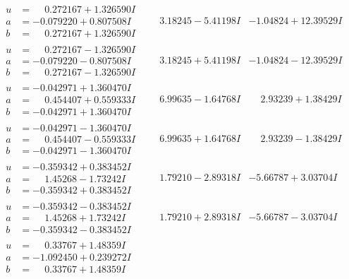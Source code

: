 \documentclass[1p]{elsarticle_modified}
\theoremstyle{definition}
\begin{document}
$$\begin{array}{c|c|c}
\begin{aligned}
u &= \phantom{-}0.272167 + 1.326590 I \\
a &= -0.079220 + 0.807508 I \\
b &= \phantom{-}0.272167 + 1.326590 I\end{aligned}
 & \phantom{-}3.18245 - 5.41198 I & -1.04824 + 12.39529 I \\ \hline\begin{aligned}
u &= \phantom{-}0.272167 - 1.326590 I \\
a &= -0.079220 - 0.807508 I \\
b &= \phantom{-}0.272167 - 1.326590 I\end{aligned}
 & \phantom{-}3.18245 + 5.41198 I & -1.04824 - 12.39529 I \\ \hline\begin{aligned}
u &= -0.042971 + 1.360470 I \\
a &= \phantom{-}0.454407 + 0.559333 I \\
b &= -0.042971 + 1.360470 I\end{aligned}
 & \phantom{-}6.99635 - 1.64768 I & \phantom{-}2.93239 + 1.38429 I \\ \hline\begin{aligned}
u &= -0.042971 - 1.360470 I \\
a &= \phantom{-}0.454407 - 0.559333 I \\
b &= -0.042971 - 1.360470 I\end{aligned}
 & \phantom{-}6.99635 + 1.64768 I & \phantom{-}2.93239 - 1.38429 I \\ \hline\begin{aligned}
u &= -0.359342 + 0.383452 I \\
a &= \phantom{-}1.45268 - 1.73242 I \\
b &= -0.359342 + 0.383452 I\end{aligned}
 & \phantom{-}1.79210 - 2.89318 I & -5.66787 + 3.03704 I \\ \hline\begin{aligned}
u &= -0.359342 - 0.383452 I \\
a &= \phantom{-}1.45268 + 1.73242 I \\
b &= -0.359342 - 0.383452 I\end{aligned}
 & \phantom{-}1.79210 + 2.89318 I & -5.66787 - 3.03704 I \\ \hline\begin{aligned}
u &= \phantom{-}0.33767 + 1.48359 I \\
a &= -1.092450 + 0.239272 I \\
b &= \phantom{-}0.33767 + 1.48359 I\end{aligned}

\end{array}$$
\end{document}
